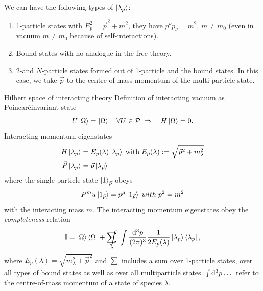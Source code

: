 We can have the following types of $\ket{\lambda_{\vec{p}}}$:
\begin{enumerate}
	\item 1-particle states with $E^2_p = \vec{p}^2+m^2$, they have $p^{\nu}p_{\nu}=m^2$, $m\neq m_0$ (even in vacuum $m \neq m_0$ because of self-interactions).
	\item Bound states with no analogue in the free theory.
	\item 2-and $N$-particle states formed out of 1-particle and the bound states. In this case, we take $\vec{p}$ to the centre-of-mass momentum of the multi-particle state.
\end{enumerate}
\begin{mybox}{Hilbert space of interacting theory}
	Definition of interacting vacuum as Poincaréinvariant state
	\begin{equation}
	\label{eq:vacuumPoincareInvariant}
	U\ket{\Omega}= \ket{\Omega}\quad \forall U\in \mathcal{P}\; \Rightarrow \quad  H\ket{\Omega}=0.
	\end{equation}
	Interacting momentum eigenstates
	\begin{align}
	H\ket{\lambda_{\vec{p}}} &=E_{\vec{p}}(\lambda) \ket{\lambda_{\vec{p}}}\; \mathrm{with}\; E_{\vec{p}}(\lambda) :=\sqrt{\vec{p}^2+m^2_{\lambda}}\\
	\vec{P}\ket{\lambda_{\vec{p}}} &= \vec{p} \ket{\lambda_{\vec{p}}}
	\end{align}
where the single-particle state $\ket{1}_{\vec{p}}$ obeys
\begin{equation}
	P^mu \ket{1_{\vec{p}}}=p^\mu \ket{1_{\vec{p}}} \; with \; p^2=m^2
\end{equation}
with the interacting mass $m$. The interacting momentum eigenstates obey the \emph{completeness} relation
\begin{equation}
	\label{eq:completenessrelation}
	\mI=\ket{\Omega}\bra{\Omega}+ \sum_\lambda\hspace{-0.4cm}\int  \;\int \pmeasure \frac{1}{2 E_p(\lambda)} \ket{\lambda_p} \bra{\lambda_p},
\end{equation}
where $E_p(\lambda)=\sqrt{m^2_{\lambda}+\vec{p}^2}$ and $\sum$ includes a sum over 1-particle states, over all types of bound states as well as over all multiparticle states. $\int \mathrm{d}^3 p \dots$ refer to the centre-of-mass momentum of a state of species $\lambda$.\\
\end{mybox}
